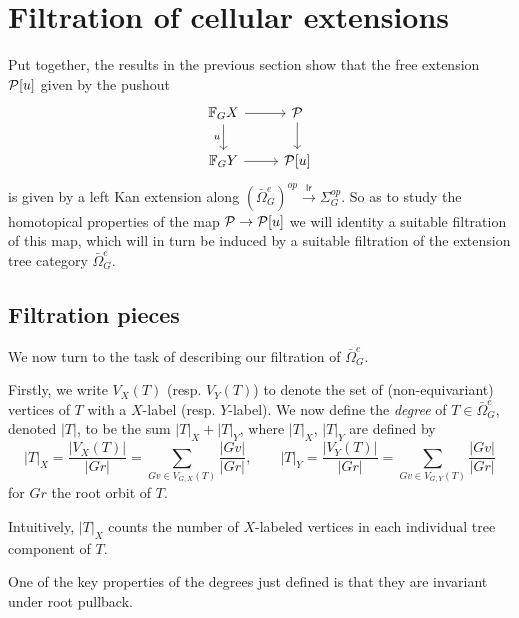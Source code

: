 \documentclass[a4paper,10pt]{article}%
\begin{document}
\newpage



\section{Filtration of cellular extensions}

Put together, the results in the previous section show that the free extension $\P[u]$ given by the pushout
\[
\begin{tikzcd}
  \mathbb F_G X \arrow[d, "u"'] \arrow[r] & \P \arrow[d]\\
  \mathbb F_G Y \arrow[r] & \P[u]
\end{tikzcd}
\]
is given by a left Kan extension along 
$(\bar{\Omega}_{G}^e)^{op} \xrightarrow{\mathsf{lr}} \Sigma_G^{op}$. So as to study the homotopical properties of the map $\P \to \P[u]$ we will identity a suitable filtration of this map, which will in turn be induced by a suitable filtration of the extension tree category $\bar{\Omega}_{G}^e$.


\subsection{Filtration pieces}

We now turn to the task of describing our filtration of $\bar{\Omega}_{G}^e$. 

Firstly, we write $V_X(T)$ (resp. $V_Y(T)$) to denote the set of (non-equivariant) vertices of $T$ with a $X$-label (resp. $Y$-label). 
We now define the \textit{degree} of $T \in \bar{\Omega}_{G}^e$,
denoted $|T|$, to be the sum $|T|_X + |T|_Y$, where $|T|_X$, $|T|_Y$ are defined by
\[
|T|_X = \dfrac{|V_X(T)|}{|G r|} = \sum\limits_{G v\in V_{G,X}(T)}\dfrac{|G v|}{|G r|},
\qquad
|T|_Y = \dfrac{|V_Y(T)|}{|G r|} = \sum\limits_{G v\in V_{G,Y}(T)}\dfrac{|G v|}{|G r|}
\]
for $G r$ the root orbit of $T$. 

Intuitively, $|T|_X$ counts the number of $X$-labeled vertices in each individual tree component of $T$.


\begin{remark}
	One of the key properties of the degrees just defined is that they are invariant under root pullback.
\end{remark}
\end{document}

